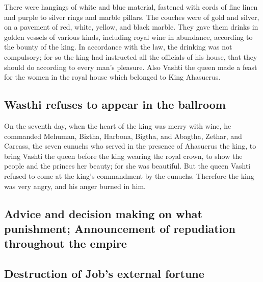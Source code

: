  There were hangings of white and blue material, fastened
with cords of fine linen and purple to silver rings and marble pillars.
The couches were of gold and silver, on a pavement of red, white,
yellow, and black marble.  They gave them drinks in golden
vessels of various kinds, including royal wine in abundance, according
to the bounty of the king.  In accordance with the law,
the drinking was not compulsory; for so the king had instructed all the
officials of his house, that they should do according to every man's
pleasure.  Also Vashti the queen made a feast for the
women in the royal house which belonged to King Ahasuerus.

\hypertarget{wasthi-refuses-to-appear-in-the-ballroom}{%
\subsection{Wasthi refuses to appear in the
ballroom}\label{wasthi-refuses-to-appear-in-the-ballroom}}

 On the seventh day, when the heart of the king was merry
with wine, he commanded Mehuman, Biztha, Harbona, Bigtha, and Abagtha,
Zethar, and Carcass, the seven eunuchs who served in the presence of
Ahasuerus the king,  to bring Vashti the queen before the
king wearing the royal crown, to show the people and the princes her
beauty; for she was beautiful.  But the queen Vashti
refused to come at the king's commandment by the eunuchs. Therefore the
king was very angry, and his anger burned in him.

\hypertarget{advice-and-decision-making-on-what-punishment-announcement-of-repudiation-throughout-the-empire}{%
\subsection{Advice and decision making on what punishment; Announcement
of repudiation throughout the
empire}\label{advice-and-decision-making-on-what-punishment-announcement-of-repudiation-throughout-the-empire}}

\hypertarget{destruction-of-jobs-external-fortune}{%
\subsection{Destruction of Job's external
fortune}\label{destruction-of-jobs-external-fortune}}

